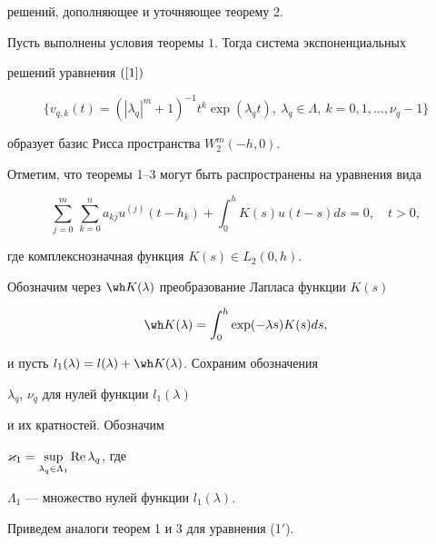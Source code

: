 решений, дополняющее и уточняющее теорему 2. 


 


\begin{thm} 


Пусть выполнены условия теоремы $1$. Тогда система экспоненциальных 


решений уравнения $(\ref{1})$ 


$$ 


\{v_{q,k}(t)=(|\lambda_q|^m+1)^{-1} t^k\exp(\lambda_q t), 


\ \lambda_q\in\Lambda,\ k=0,1,\dotsc,\nu_q-1\} 


$$ 


образует базис Рисса пространства $W^m_2(-h,0)$. 


\end{thm} 


 


Отметим, что теоремы 1--3 могут быть распространены на уравнения вида 


\begin{equation} 


\sum^m_{j=0}\,\sum^n_{k=0}a_{kj}u^{(j)}(t-h_k)+ 


\int^h_0 K(s)u(t-s)ds=0,\quad t>0,\tag{1$'$} 


\end{equation} 


где комплекснозначная функция $K(s)\in L_2(0,h)$. 


 


Обозначим через $\wh K(\lambda)$ преобразование Лапласа функции $K(s)$ 


$$ 


\wh K(\lambda)=\int^h_0 \exp(-\lambda s)K(s)ds, 


$$ 


и пусть $l_1(\lambda)=l(\lambda)+\wh K(\lambda)$. Сохраним обозначения 


$\lambda_q$, $\nu_q$ для нулей функции $l_1(\lambda)$ 


и их кратностей. Обозначим 


$\varkappa_1=\sup\limits_{\lambda_q\in\Lambda_1}\operatorname{Re}\lambda_q$, где 


$\Lambda_1$ --- множество нулей функции $l_1(\lambda)$. 


 


Приведем аналоги теорем 1 и 3 для уравнения (1$'$). 


